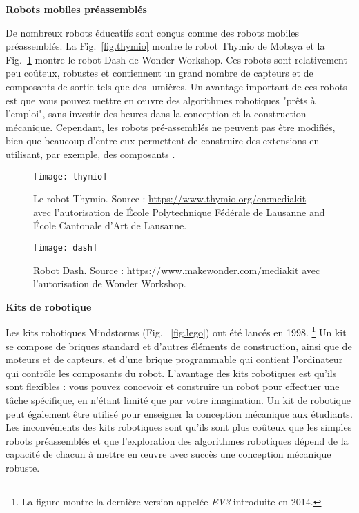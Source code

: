{\medskip

\noindent\textbf{Robots mobiles préassemblés}

De nombreux robots éducatifs sont conçus comme des robots mobiles préassemblés. La Fig.~\ref{fig.thymio} montre le robot Thymio de Mobsya et la Fig.~\ref{fig.dash} montre le robot Dash de Wonder Workshop. Ces robots sont relativement peu coûteux, robustes et contiennent un grand nombre de capteurs et de composants de sortie tels que des lumières. Un avantage important de ces robots est que vous pouvez mettre en œuvre des algorithmes robotiques "prêts à l'emploi", sans investir des heures dans la conception et la construction mécanique. Cependant, les robots pré-assemblés ne peuvent pas être modifiés, bien que beaucoup d'entre eux permettent de construire des extensions en utilisant, par exemple, des composants \lego{}.

\begin{figure}
\begin{minipage}{.45\textwidth}
\begin{center}
\texttt{[image: thymio]}
\caption{Le robot Thymio. Source : \protect\url{https://www.thymio.org/en:mediakit} avec l'autorisation de \'{E}cole Polytechnique F\'{e}d\'{e}rale de Lausanne and \'{E}cole Cantonale d'Art de Lausanne.}\label{fig.thymio}
\end{center}
\end{minipage}
\hspace{\fill}
\begin{minipage}{.45\textwidth}
\begin{center}
\texttt{[image: dash]}
\caption{Robot Dash. Source : \protect\url{https://www.makewonder.com/mediakit} avec l'autorisation de Wonder Workshop.}\label{fig.dash}
\end{center}
\end{minipage}
\end{figure}

\noindent\textbf{Kits de robotique}

Les kits robotiques \lego{} Mindstorms (Fig. ~\ref{fig.lego}) ont été lancés en 1998. \footnote{La figure montre la dernière version appelée \emph{EV3} introduite en 2014.} Un kit se compose de briques \lego{} standard et d'autres éléments de construction, ainsi que de moteurs et de capteurs, et d'une brique programmable qui contient l'ordinateur qui contrôle les composants du robot. L'avantage des kits robotiques est qu'ils sont flexibles : vous pouvez concevoir et construire un robot pour effectuer une tâche spécifique, en n'étant limité que par votre imagination. Un kit de robotique peut également être utilisé pour enseigner la conception mécanique aux étudiants. Les inconvénients des kits robotiques sont qu'ils sont plus coûteux que les simples robots préassemblés et que l'exploration des algorithmes robotiques dépend de la capacité de chacun à mettre en œuvre avec succès une conception mécanique robuste.

}
